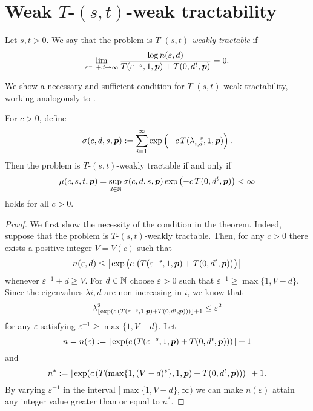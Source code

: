 \documentclass[11pt,a4paper]{article}
\newcommand{\peter}[1]{\begingroup\color{purple}#1\endgroup}
\begin{document}
\peter{
\section{Weak $T$-$(s,t)$-weak tractability} \label{sec:weak}

\begin{definition}[$T$-$(s,t)$-weak tractability]
Let $s,t>0$. We say that the problem is \emph{$T$-$(s,t)$ weakly tractable} if
    \[\lim_{\varepsilon^{-1}+d\rightarrow \infty} \frac{\log n(\varepsilon,d)}{T(\varepsilon^{-s},1,\boldsymbol{p}) + T(0,d^t,\boldsymbol{p})} = 0.\]
\end{definition}

We show a necessary and sufficient condition for $T$-$(s,t)$-weak tractability, working analogously to \cite{WW17}.
\begin{theorem}\label{thm:weak}
For $c>0$, define
\[
\sigma (c,d,s,\boldsymbol{p}):= \sum_{i=1}^\infty \exp \left(-c\, T(\lambda_{i,d}^{-s},1,\boldsymbol{p})\right).
\]
Then the problem is $T$-$(s,t)$-weakly tractable if and only if
\[
\mu (c,s,t,\boldsymbol{p})=\sup_{d\in\mathbb{N}} \sigma (c,d,s,\boldsymbol{p}) \exp\left(-c\, T(0,d^t,\boldsymbol{p})\right)<\infty
\]
holds for all $c>0$.
\end{theorem}
\begin{proof}
 We first show the necessity of the condition in the theorem.   Indeed, suppose that the problem is  $T$-$(s,t)$-weakly tractable. Then, for any $c>0$ there exists a positive integer $V=V(c)$ such that  
 \[
 n(\varepsilon,d)\le 
 \left\lfloor \exp\left(c\,
 \left(T(\varepsilon^{-s},1,\boldsymbol{p}) + T(0,d^t,\boldsymbol{p})\right)
 \right) \right\rfloor
 \]
 whenever $\varepsilon^{-1} + d \ge V$. For $d\in\mathbb{N}$ 
 choose $\varepsilon>0$ such that $\varepsilon^{-1}\ge \max\{1,V-d\}$. Since the eigenvalues $\lambda{i,d}$ are non-increasing in $i$, we know that
 \[
 \lambda_{\lfloor \exp(c\,
 (T(\varepsilon^{-s},1,\boldsymbol{p}) + T(0,d^t,\boldsymbol{p}))) \rfloor+1}^2 \le \varepsilon^2
 \]
 for any $\varepsilon$ satisfying $\varepsilon^{-1}\ge \max\{1,V-d\}$.
Let 
\[
n=n(\varepsilon):= \lfloor \exp(c\,
 (T(\varepsilon^{-s},1,\boldsymbol{p}) + T(0,d^t,\boldsymbol{p}))) \rfloor+1
\]
and
\[
n^*:= \lfloor \exp(c\,
 (T(\max\{1,(V-d)^s\},1,\boldsymbol{p}) + T(0,d^t,\boldsymbol{p}))) \rfloor+1.
\]
By varying $\varepsilon^{-1}$ in the interval 
$[\max\{1,V-d\},\infty)$ we can make $n(\varepsilon)$ attain 
any integer value greater than or equal to $n^*$.


\end{proof}}
\end{document}
